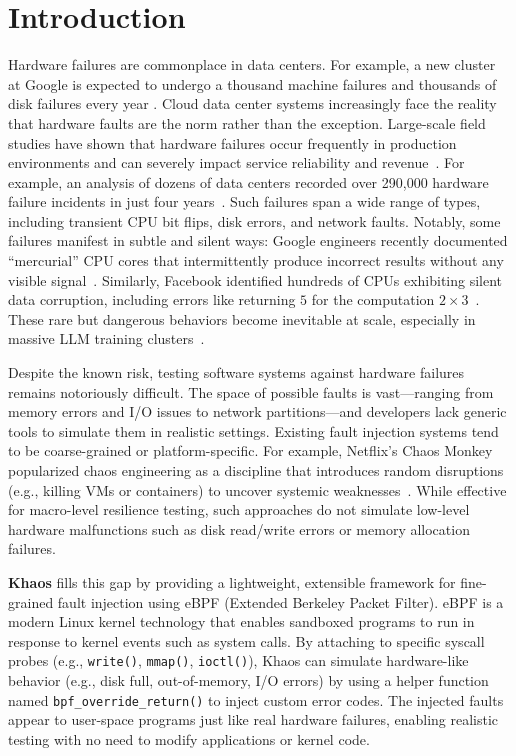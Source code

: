 \section{Introduction}
\label{sec:introduction}

Hardware failures are commonplace in data centers. For example, a new cluster at Google is expected to undergo a thousand machine failures and thousands of disk failures every year \cite{Dean:2009}. Cloud data center systems increasingly face the reality that hardware faults are the norm rather than the exception. Large-scale field studies have shown that hardware failures occur frequently in production environments and can severely impact service reliability and revenue~\cite{Wang2017}. For example, an analysis of dozens of data centers recorded over 290{,}000 hardware failure incidents in just four years~\cite{Wang2017}. Such failures span a wide range of types, including transient CPU bit flips, disk errors, and network faults. Notably, some failures manifest in subtle and silent ways: Google engineers recently documented “mercurial” CPU cores that intermittently produce incorrect results without any visible signal~\cite{Hochschild2021}. Similarly, Facebook identified hundreds of CPUs exhibiting silent data corruption, including errors like returning $5$ for the computation $2 \times 3$~\cite{Dixit2021}. These rare but dangerous behaviors become inevitable at scale, especially in massive LLM training clusters~\cite{Zhang2022opt}.

Despite the known risk, testing software systems against hardware failures remains notoriously difficult. The space of possible faults is vast—ranging from memory errors and I/O issues to network partitions—and developers lack generic tools to simulate them in realistic settings. Existing fault injection systems tend to be coarse-grained or platform-specific. For example, Netflix's Chaos Monkey popularized chaos engineering as a discipline that introduces random disruptions (e.g., killing VMs or containers) to uncover systemic weaknesses~\cite{Basiri2016}. While effective for macro-level resilience testing, such approaches do not simulate low-level hardware malfunctions such as disk read/write errors or memory allocation failures.

\textbf{Khaos} fills this gap by providing a lightweight, extensible framework for fine-grained fault injection using eBPF (Extended Berkeley Packet Filter). eBPF is a modern Linux kernel technology that enables sandboxed programs to run in response to kernel events such as system calls. By attaching to specific syscall probes (e.g., \texttt{write()}, \texttt{mmap()}, \texttt{ioctl()}), Khaos can simulate hardware-like behavior (e.g., disk full, out-of-memory, I/O errors) by using a helper function named \texttt{bpf\_override\_return()} to inject custom error codes. The injected faults appear to user-space programs just like real hardware failures, enabling realistic testing with no need to modify applications or kernel code.

